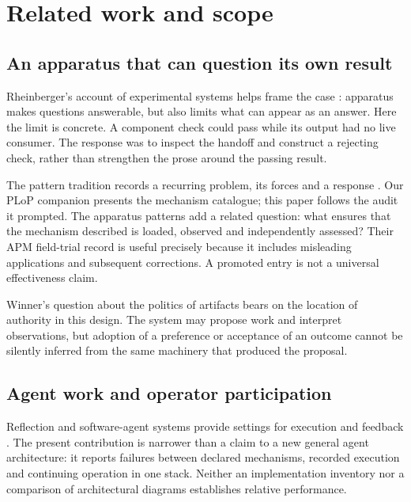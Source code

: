 \section{Related work and scope}\label{sec:related}

\subsection*{An apparatus that can question its own result}

Rheinberger's account of experimental systems helps frame the case
\cite{rheinberger1997epistemic}: apparatus makes questions answerable, but also
limits what can appear as an answer. Here the limit is concrete. A component
check could pass while its output had no live consumer. The response was to
inspect the handoff and construct a rejecting check, rather than strengthen
the prose around the passing result.

The pattern tradition records a recurring problem, its forces and a response
\cite{alexander1977a,gamma1994a,gabriel1writer}. Our PLoP companion presents the
mechanism catalogue; this paper follows the audit it prompted. The apparatus
patterns add a related question: what ensures that the mechanism described is
loaded, observed and independently assessed? Their APM field-trial record is
useful precisely because it includes misleading applications and subsequent
corrections. A promoted entry is not a universal effectiveness claim.

Winner's question about the politics of artifacts
\cite{winner1980artifacts} bears on the location of authority in this design.
The system may propose work and interpret observations, but adoption of a
preference or acceptance of an outcome cannot be silently inferred from the
same machinery that produced the proposal.

\subsection*{Agent work and operator participation}

Reflection and software-agent systems provide settings for execution and
feedback \cite{shinn2023reflexion,yang2024sweagent,wang2025openhands}.
The present contribution is narrower than a claim to a new general agent
architecture: it reports failures between declared mechanisms, recorded
execution and continuing operation in one stack. Neither an implementation
inventory nor a comparison of architectural diagrams establishes relative
performance.

